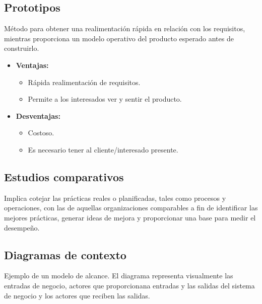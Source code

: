 \documentclass{templateApunte}
\begin{document}
\subsection{Prototipos}\hypertarget{prototipos}{}
Método para obtener una realimentación rápida en relación con los requisitos, mientras proporciona un modelo operativo del producto esperado antes de construirlo.
\begin{itemize}
  \item \textbf{Ventajas:}
  \begin{itemize}
    \item Rápida realimentación de requisitos.
    \item Permite a los interesados ver y sentir el producto.
  \end{itemize}
  \item \textbf{Desventajas:}
  \begin{itemize}
    \item Costoso.
    \item Es necesario tener al cliente/interesado presente.
  \end{itemize}
\end{itemize}

\subsection{Estudios comparativos}\hypertarget{estudios_comparativos}{}
Implica cotejar las prácticas reales o planificadas, tales como procesos y operaciones, con las de aquellas organizaciones comparables a fin de identificar las mejores prácticas, generar ideas de mejora y proporcionar una base para medir el desempeño.

\subsection{Diagramas de contexto}\hypertarget{diagramas_de_contexto}{}
Ejemplo de un modelo de alcance. El diagrama representa visualmente las entradas de negocio, actores que proporcionana entradas y las salidas del sistema de negocio y los actores que reciben las salidas.
\end{document}
